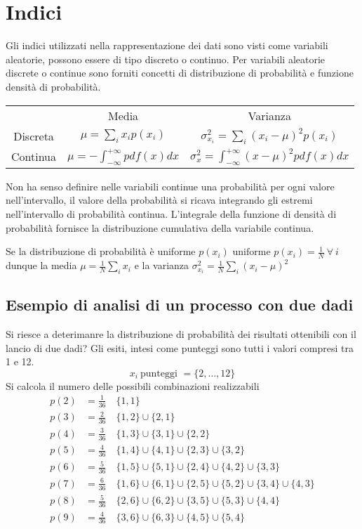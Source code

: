 \section{Indici}
Gli indici utilizzati nella rappresentazione dei dati sono visti come variabili 
aleatorie, possono essere di tipo discreto o continuo. Per variabili aleatorie 
discrete o continue sono forniti concetti di distribuzione di probabilità e 
funzione densità di probabilità.
\begin{table}[h]\centering
    \begin{tabular}{c | c|c}
             & Media & Varianza \\ 
    Discreta & $\mu = \sum_i x_i p(x_i)$ & $ \sigma^2_{x_i}= \sum_{i} (x_i -\mu)^2 p(x_i)$ \\ \hline
    Continua & $\mu = -\int_{-\infty}^{+\infty} pdf(x) dx$ &  $\sigma_x^2 = \int_{-\infty}^{+\infty} (x-\mu)^2 pdf(x)dx $ 
    \end{tabular}
\end{table}

Non ha senso definire nelle variabili continue una probabilità per ogni valore 
nell'intervallo, il valore della probabilità si ricava integrando gli estremi 
nell'intervallo di probabilità continua.
L'integrale della funzione di densità di probabilità fornisce la distribuzione 
cumulativa della variabile continua.


Se la distribuzione di probabilità è uniforme $p(x_i) \text{ uniforme } p(x_i) = \frac{1}{N}\ \forall\ i$ dunque la media $ \mu = \frac{1}{N} \sum_i x_i$
e la varianza
$\sigma_{x_i}^2 = \frac{1}{N} \sum_i (x_i - \mu)^2 $



\subsection{Esempio di analisi di un processo con due dadi}

Si riesce a deterimanre la distribuzione di probabilità dei risultati 
ottenibili con il lancio di due dadi?
Gli esiti, intesi come punteggi sono tutti i valori compresi tra 1 e 12.
$$
x_i \ \text{punteggi } = \{2, \ldots, 12\}
$$
Si calcola il numero delle possibili combinazioni realizzabili 
$$\begin{aligned}
p(2) &= \frac{1}{36} \quad \{1,1\} \\
p(3) &= \frac{2}{36} \quad \{1,2\} \cup \{2,1\} \\
p(4) & = \frac{3}{36} \quad \{1,3\} \cup \{3,1\}\cup\{2,2\}\\
p(5) & = \frac{4}{36} \quad \{1,4\} \cup \{4,1\} \cup \{2,3\} \cup \{3,2\} \\
p(6) &= \frac{5}{36} \quad \{1,5\}\cup\{5,1\}\cup\{2,4\}\cup\{4,2\}\cup\{3,3\}  \\
p(7) & = \frac{6}{36} \quad \{1,6\}\cup\{6,1\}\cup\{2,5\}\cup\{5,2\}\cup\{3,4\}\cup\{4,3\}\\
p(8) &= \frac{5}{36} \quad \{2,6\}\cup\{6,2\}\cup\{3,5\}\cup\{5,3\}\cup\{4,4\}  \\
p(9) & = \frac{4}{36}\quad \{3,6\}\cup\{6,3\}\cup\{4,5\}\cup\{5,4\} \\
\end{aligned}
$$

